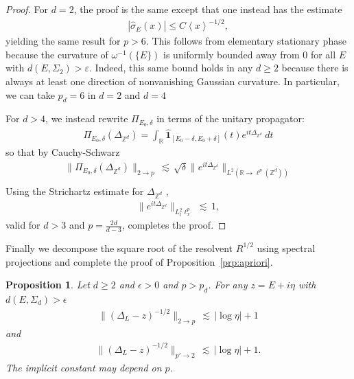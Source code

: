 \documentclass[11pt]{amsart}
\def\R{{\mathbb{R}}}
\def\Z{{\mathbb{Z}}}
\def\eps{{\varepsilon}}
\def\One{{\mathbf{1}}}
\def\lsim{{\,\lesssim\,}}
\numberwithin{equation}{section}
\numberwithin{theorem}{section}
\newtheorem{proposition}[theorem]{Proposition}
\begin{document}
\begin{proof}
For $d=2$, the proof is the same except that one instead has the estimate
\begin{align*}
|\hat{\sigma}_E(x)|\leq C\left<x \right>^{-1 /2},
\end{align*}
yielding the same result for $p>6$.
This follows from elementary stationary phase because the curvature of $\omega^{-1}(\{E\})$ is uniformly bounded away from $0$ for all $E$ with $d(E,\Sigma_2)>\eps$.  Indeed, this same bound holds in
any $d\geq 2$ because there is always at least one direction of nonvanishing Gaussian curvature.  In particular, we can take $p_d=6$ in $d=2$ and $d=4$

For $d>4$, we instead rewrite  $\Pi_{E_0,\delta}$ in terms of the unitary propagator:
\begin{align*}
\Pi_{E_0,\delta}(\Delta_{\Z^{d}})=\int_{\R}\hat{\One}_{[E_0-\delta,E_0+\delta]}(t)e^{it\Delta_{\Z^{d}}}\:dt
\end{align*}
so that by Cauchy-Schwarz
\begin{align*}
\|\Pi_{E_0,\delta}(\Delta_{\Z^{d}})\|_{2\to p} \lsim
\sqrt{\delta}\|e^{it\Delta_{\Z^{d}}}\|_{L^2(\R\to \ell^p(\Z^{d}))}\\
\end{align*}
Using the Strichartz estimate for $\Delta_{\Z^{d}}$ \cite[Thm 1]{stefanov2005asymptotic},
\begin{align*}
\|e^{it\Delta_{\Z^{d}}}\|_{L^2_t\ell^p_x}\lsim 1,
\end{align*}
valid for $d>3$ and $p=\frac{2d}{d-3}$, completes the proof.
\end{proof}

Finally we decompose the square root of the resolvent $R^{1/2}$ using spectral projections and complete the proof of Proposition~\ref{prp:apriori}.

\begin{proposition}
\label{prp:R_0Bounds}
Let $d\geq 2$ and $\epsilon>0$ and $p>p_d$.
For any $z=E+i\eta$ with $d(E,\Sigma_d)>\epsilon$
\begin{align}\label{eq:freeResolvent2Top}
\|(\Delta_L-z)^{-1 /2}\|_{2\to p}\lsim |\log \eta| + 1
\end{align}
and
\begin{align}\label{eq:freeResolventpTo2}
\|(\Delta_L-z)^{-1 /2}\|_{p'\to 2}\lsim |\log \eta| + 1.
\end{align}
The implicit constant may depend on $p$.
\end{proposition}
\end{document}
